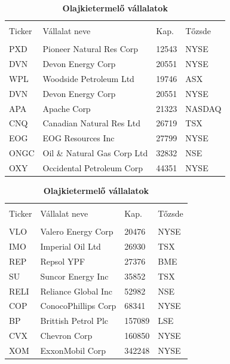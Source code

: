 \documentclass[12pt,bibliography=totoc]{article}
\begin{document}
\begin{table}[H]
\caption{Az elemzésbe bevont vállalatok, profil szerint csoportosítva} %
\fontsize{9}{9}\selectfont
\centering
\begin{subtable}[t]{0.45\textwidth}
\centering
\begin{tabular}{l  lll}%
\hline\hline \\ [-1.5ex]                         %

Ticker	& Vállalat neve	&	Kap.	&	Tőzsde \\ 
\hline \\ [-1.5ex] 
PXD & Pioneer Natural Res Corp		&12543 &	NYSE \\
DVN & Devon Energy Corp					&20551 &	NYSE \\
WPL & Woodside Petroleum Ltd				&19746 &		ASX \\
DVN & Devon Energy Corp					&20551 &	NYSE \\
APA & Apache Corp							&21323 &		NASDAQ \\
CNQ & Canadian Natural Res Ltd		&26719 &		TSX \\
EOG & EOG  Resources Inc					&27799 &		NYSE \\
ONGC & Oil \& Natural Gas Corp Ltd	&32832 &		NSE \\
OXY & Occidental Petroleum Corp			&44351 &		NYSE \\



\hline            
\end{tabular}
\caption{\textbf{Olajkietermelő vállalatok}}
\end{subtable}
\hspace{\fill}
\begin{subtable}[t]{0.45\textwidth}
\centering
\begin{tabular}{l lll}%
\hline\hline \\ [-1.5ex]                         %

Ticker	& Vállalat neve	&	Kap.	&	Tőzsde \\ 

\hline \\ [-1.5ex]  
VLO	& Valero Energy Corp	& 20476 & NYSE \\
IMO	& Imperial Oil Ltd	& 26930	& TSX \\
REP	& Repsol YPF	& 27376	& BME \\
SU	& Suncor Energy Inc	& 35852	& TSX \\
RELI& 	Reliance Global Inc	& 52982	& NSE \\
COP	& ConocoPhillips Corp	& 68341	& NYSE \\
BP	& Brittish Petrol Plc	& 157089	& LSE \\
CVX	& Chevron Corp	& 160850	& NYSE \\ 
XOM	& ExxonMobil Corp	& 342248 	& NYSE \\


\end{tabular}
\end{subtable}
\end{table}
\end{document}
